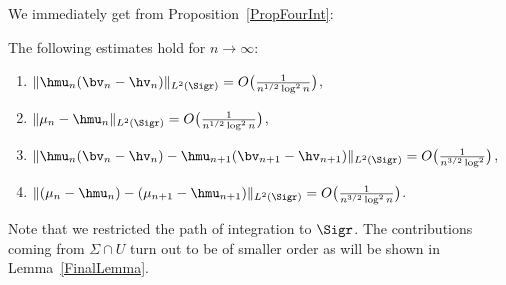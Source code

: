 We immediately get from Proposition~\ref{PropFourInt}:
\begin{Corollary}\label{CorFourInt}
The following estimates hold for $n \to \infty$:
\begin{enumerate}[$(i)$]\itemsep=0pt
 \item $\Vert \hmu_n (\bv_n - \hv_n) \Vert_{L^2(\Sigr)} = O\big(\frac{1}{n^{1/2}\log^2 n}\big)$,
 \item $\Vert \mu_n - \hmu_n \Vert_{L^2(\Sigr)} = O\big(\frac{1}{n^{1/2}\log^2 n}\big)$,
 \item $\Vert \hmu_n (\bv_n - \hv_n) - \hmu_{n+1} (\bv_{n+1} - \hv_{n+1}) \Vert_{L^2(\Sigr)} = O\big(\frac{1}{n^{3/2}\log^2}
 \big)$,
 \item $\Vert (\mu_n - \hmu_n) - (\mu_{n+1} - \hmu_{n+1}) \Vert_{L^2(\Sigr)} = O\big(\frac{1}{n^{3/2}\log^2 n}\big)$.
\end{enumerate}
\end{Corollary}
Note that we restricted the path of integration to $\Sigr$. The contributions coming from $\Sigma \cap U$ turn out to be of smaller order as will be shown in Lemma~\ref{FinalLemma}.

